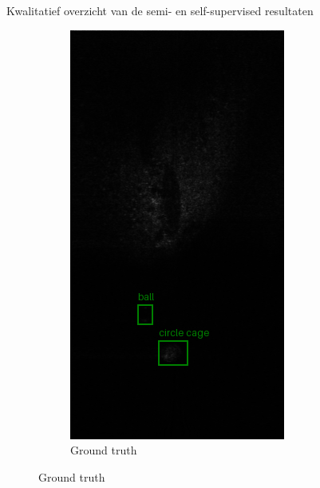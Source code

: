 \documentclass[aspectratio=169]{beamer}
\begin{document}
    \begin{frame}{Kwalitatief overzicht van de semi- en self-supervised resultaten}
        \begin{figure}
            \centering
            \begin{subfigure}{.2\textwidth}
                \centering
                \captionsetup{justification=centering}
                \includegraphics[width=0.9\linewidth]{1_gt.png}
                \caption{Ground truth}
            \end{subfigure}%

\end{figure}
\end{frame}
\end{document}
